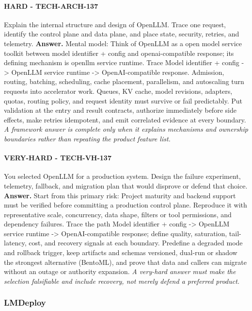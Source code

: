 \paragraph{HARD - TECH-ARCH-137} Explain the internal structure and design of OpenLLM. Trace one request, identify the control plane and data plane, and place state, security, retries, and telemetry.
\textbf{Answer.} Mental model: Think of OpenLLM as a open model service toolkit between model identifier + config and openai-compatible response; its defining mechanism is openllm service runtime. Trace Model identifier + config -> OpenLLM service runtime -> OpenAI-compatible response. Admission, routing, batching, scheduling, cache placement, parallelism, and autoscaling turn requests into accelerator work. Queues, KV cache, model revisions, adapters, quotas, routing policy, and request identity must survive or fail predictably. Put validation at the entry and result contracts, authorize immediately before side effects, make retries idempotent, and emit correlated evidence at every boundary.
\textit{A framework answer is complete only when it explains mechanisms and ownership boundaries rather than repeating the product feature list.}
\paragraph{VERY-HARD - TECH-VH-137} You selected OpenLLM for a production system. Design the failure experiment, telemetry, fallback, and migration plan that would disprove or defend that choice.
\textbf{Answer.} Start from this primary risk: Project maturity and backend support must be verified before committing a production control plane. Reproduce it with representative scale, concurrency, data shape, filters or tool permissions, and dependency failures. Trace the path Model identifier + config -> OpenLLM service runtime -> OpenAI-compatible response; define quality, saturation, tail-latency, cost, and recovery signals at each boundary. Predefine a degraded mode and rollback trigger, keep artifacts and schemas versioned, dual-run or shadow the strongest alternative (BentoML), and prove that data and callers can migrate without an outage or authority expansion.
\textit{A very-hard answer must make the selection falsifiable and include recovery, not merely defend a preferred product.}
\subsubsection*{LMDeploy}
